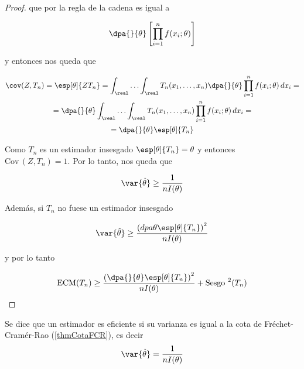 \documentclass{apuntes}
\begin{document}
\begin{proof}
que por la regla de la cadena es igual a

\[ \dpa{}{\theta}\left[\prod_{i=1}^n f(x_i;\theta) \right] \]

y entonces nos queda que

\begin{gather*}
\cov (Z,T_n) = \esp[\theta]{ZT_n} = \int_\real \dotsc \int_\real T_n(x_1,\dotsc,x_n) \dpa{}{\theta} \prod_{i=1}^n f(x_i;\theta)\, dx_i = \\
 = \dpa{}{\theta} \int_\real \dotsc \int_\real T_n(x_1,\dotsc,x_n) \prod_{i=1}^n f(x_i;\theta)\, dx_i =\\
 = \dpa{}{\theta} \esp[\theta]{T_n}
 \end{gather*}

Como $T_n$ es un estimador insesgado $\esp[\theta]{T_n}  = \theta$ y entonces $\text{Cov}\,(Z,T_n) = 1$. Por lo tanto, nos queda que

\[ \var{\hat\theta} \geq \frac{1}{nI(\theta)} \]

Además, si $T_n$ no fuese un estimador insesgado

\[ \var{\hat\theta} \geq \frac{\left(dpa{}{\theta} \esp[\theta]{T_n} \right)^2}{n I(\theta)} \]

y por lo tanto

\[ \text{ECM}(T_n) \geq \frac{\left(\dpa{}{\theta} \esp[\theta]{T_n}\right)^2}{n I(\theta)} + \text{Sesgo }^2 (T_n) \]
\end{proof}

\begin{defn}
Se dice que un estimador es eficiente si su varianza es igual a la cota de Fréchet-Cramér-Rao (\ref{thmCotaFCR}), es decir
\[ \var{\hat\theta} = \frac{1}{nI(\theta)} \]
\end{defn}

\vspace{-10mm} %
\end{document}
